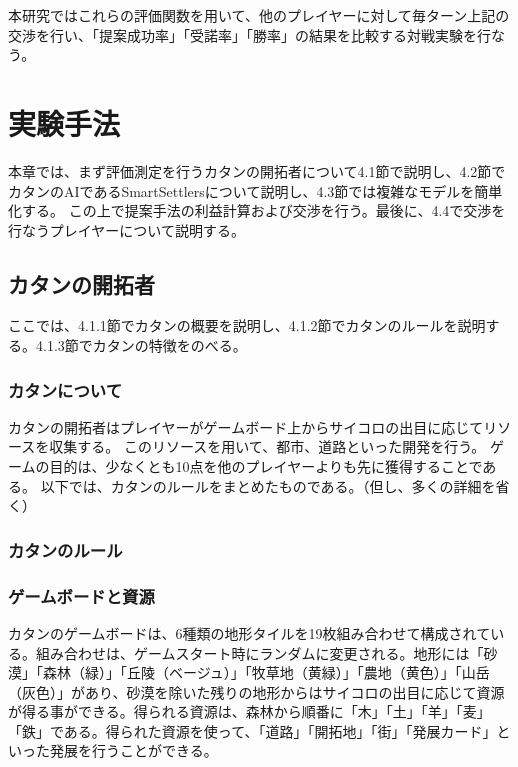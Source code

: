 \documentclass[a4, 10pt,dvipdfmx]{jsarticle}
\begin{document}
本研究ではこれらの評価関数を用いて、他のプレイヤーに対して毎ターン上記の交渉を行い、「提案成功率」「受諾率」「勝率」の結果を比較する対戦実験を行なう。

\section{実験手法}

本章では、まず評価測定を行うカタンの開拓者について4.1節で説明し、4.2節でカタンのAIであるSmartSettlersについて説明し、4.3節では複雑なモデルを簡単化する。
この上で提案手法の利益計算および交渉を行う。最後に、4.4で交渉を行なうプレイヤーについて説明する。

\subsection{カタンの開拓者}
ここでは、4.1.1節でカタンの概要を説明し、4.1.2節でカタンのルールを説明する。4.1.3節でカタンの特徴をのべる。

\subsubsection{カタンについて}
カタンの開拓者はプレイヤーがゲームボード上からサイコロの出目に応じてリソースを収集する。
このリソースを用いて、都市、道路といった開発を行う。
ゲームの目的は、少なくとも10点を他のプレイヤーよりも先に獲得することである。
以下では、カタンのルールをまとめたものである。（但し、多くの詳細を省く）
\subsubsection{カタンのルール}

\subsubsection*{ゲームボードと資源}
カタンのゲームボードは、6種類の地形タイルを19枚組み合わせて構成されている。組み合わせは、ゲームスタート時にランダムに変更される。地形には「砂漠」「森林（緑）」「丘陵（ベージュ）」「牧草地（黄緑）」「農地（黄色）」「山岳（灰色）」があり、砂漠を除いた残りの地形からはサイコロの出目に応じて資源が得る事ができる。得られる資源は、森林から順番に「木」「土」「羊」「麦」「鉄」である。得られた資源を使って、「道路」「開拓地」「街」「発展カード」といった発展を行うことができる。
\end{document}
